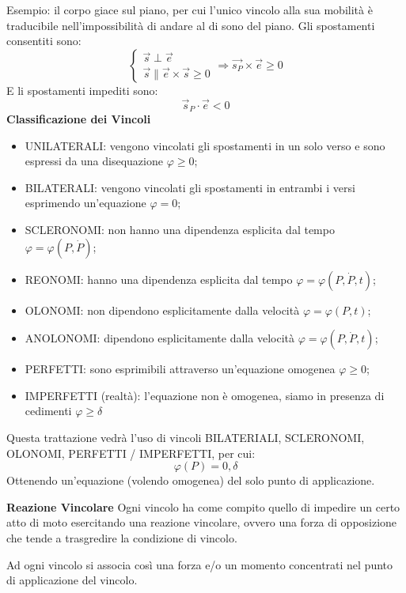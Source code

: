 \documentclass{article}
\begin{document}
\begin{adjustwidth}{2in}{}
Esempio: il corpo giace sul piano, per cui l'unico vincolo alla sua mobilità è traducibile nell'impossibilità di andare al di sono del piano.\newline
Gli spostamenti consentiti sono: 
\[
\begin{cases}
\vec{s} \perp \vec{e}\\
\vec{s} \parallel \vec{e} \times \vec{s} \geq 0
\end{cases} \Rightarrow \vec{s_{P}} \times \vec{e} \geq 0
\]
E li spostamenti impediti sono: 
\[\vec{s}_P \cdot \vec{e} < 0\]
{\Large \textbf{Classificazione dei Vincoli}} \mbox{} \newline
\begin{itemize}
\item UNILATERALI: vengono vincolati gli spostamenti in un solo verso e sono espressi da una disequazione $\varphi \geq 0$;
\item BILATERALI: vengono vincolati gli spostamenti in entrambi i versi esprimendo un’equazione $\varphi = 0$;
\item SCLERONOMI: non hanno una dipendenza esplicita dal tempo $\varphi = \varphi(P, \dot{P})$;
\item REONOMI: hanno una dipendenza esplicita dal tempo $\varphi = \varphi(P, \dot{P}, t)$;
\item OLONOMI: non dipendono esplicitamente dalla velocità $\varphi = \varphi(P, t)$;
\item ANOLONOMI: dipendono esplicitamente dalla velocità $\varphi = \varphi(P, \dot{P}, t)$;
\item PERFETTI: sono esprimibili attraverso un’equazione omogenea $\varphi \geq 0$;
\item IMPERFETTI (realtà): l’equazione non è omogenea, siamo in presenza di cedimenti $\varphi \geq \delta$
\end{itemize}
Questa trattazione vedrà l'uso di vincoli BILATERIALI, SCLERONOMI, OLONOMI, PERFETTI / IMPERFETTI, per cui:
\[ \varphi(P) = 0, \delta\]
Ottenendo un'equazione (volendo omogenea) del solo punto di applicazione. \newpage

{\Large \textbf{Reazione Vincolare}} \mbox{} \newline
Ogni vincolo ha come compito quello di impedire un certo atto di moto esercitando una reazione vincolare, ovvero una forza di opposizione che tende a trasgredire la condizione di vincolo. \newline

Ad ogni vincolo si associa così una forza e/o un momento concentrati nel punto di applicazione del vincolo. \newline


\end{adjustwidth}
\end{document}
